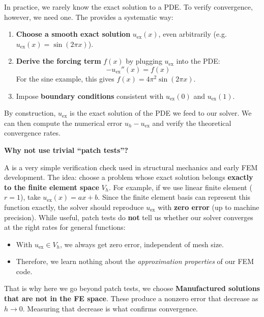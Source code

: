 \highspace
\begin{flushleft}
\end{flushleft}
In practice, we rarely know the exact solution to a PDE. To verify convergence, however, we need one. The  provides a systematic way:
\begin{enumerate}
    \item \textbf{Choose a smooth exact solution} $u_{\text{ex}}(x)$, even arbitrarily (e.g. $u_{\text{ex}}(x) = \sin(2\pi x)$).
    \item \textbf{Derive the forcing term} $f(x)$ by plugging $u_{\text{ex}}$ into the PDE:
    \begin{equation*}
        -u_{\text{ex}}''(x) = f(x)
    \end{equation*}
    For the sine example, this gives $f(x) = 4\pi^2\sin(2\pi x)$.
    \item Impose \textbf{boundary conditions} consistent with $u_{\text{ex}}(0)$ and $u_{\text{ex}}(1)$.
\end{enumerate}
By construction, $u_{\text{ex}}$ is the exact solution of the PDE we feed to our solver. We can then compute the numerical error $u_h - u_{\text{ex}}$ and verify the theoretical convergence rates.

\highspace
\begin{flushleft}
    \textcolor{Green3}{ \textbf{Why not use trivial ``patch tests''?}}
\end{flushleft}
A  is a very simple verification check used in structural mechanics and early FEM development. The idea: choose a problem whose exact solution belongs \textbf{exactly to the finite element space} $V_{h}$. For example, if we use linear finite element ($r=1$), take $u_{\text{ex}}(x) = a x + b$. Since the finite element basis can represent this function exactly, the solver should reproduce $u_{\text{ex}}$ with \textbf{zero error} (up to machine precision). While useful, patch tests do \textbf{not} tell us whether our solver converges at the right rates for general functions:
\begin{itemize}
    \item With $u_{\text{ex}}\in V_h$, we always get zero error, independent of mesh size.
    \item Therefore, we learn nothing about the \emph{approximation properties} of our FEM code.
\end{itemize}
That is why here we go beyond patch tests, we choose \textbf{Manufactured solutions that are not in the FE space}. These produce a nonzero error that decrease as $h \to 0$. Measuring that decrease is what confirms convergence.

